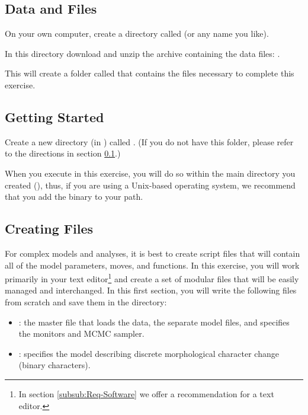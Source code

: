 \medskip
\subsection{Data and Files}\label{subsect:Exercise-DataFiles}

{\begin{framed}
On your own computer, create a directory called {\textcolor{red}{}} (or any name you like). 

In this directory download and unzip the archive containing the data files: \href{https://github.com/revbayes/revbayes_tutorial/tree/master/RB_Discrete_Morphology_Tutorial/data.zip}{}.

This will create a folder called  that contains the files necessary to complete this exercise.
\end{framed}}


\bigskip
\subsection{Getting Started}\label{subsect:Exercise-GetStart}

{\begin{framed}
Create a new directory (in ) called {\textcolor{red}{}}. (If you do not have this folder, please refer to the directions in section \ref{subsect:Exercise-DataFiles}.)
\end{framed}}

When you execute \RevBayes in this exercise, you will do so within the main directory you created (), thus, if you are using a Unix-based operating system, we recommend that you add the \RevBayes binary to your path.
\bigskip

\subsection{Creating \Rev Files}\label{subsect:Exercise-CreatingFiles}

For complex models and analyses, it is best to create \Rev script files that will contain all of the model parameters, moves, and functions. 
In this exercise, you will work primarily in your text editor\footnote{In section \ref{subsub:Req-Software} we offer a recommendation for a text editor.} and create a set of modular files that will be easily managed and interchanged.
In this first section, you will write the following files from scratch and save them in the  directory:
\begin{itemize}[noitemsep,topsep=0pt]
\item {}: the master \Rev file that loads the data, the separate model files, and specifies the monitors and MCMC sampler.
\item {}: specifies the model describing discrete morphological character change (binary characters). 
\end{itemize}


